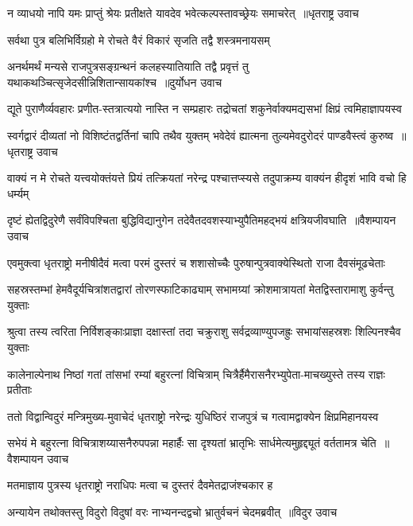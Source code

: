 \twolineshloka
{न व्याधयो नापि यमः प्राप्तुं श्रेयः प्रतीक्षते}
{यावदेव भवेत्कल्पस्तावच्छ्रेयः समाचरेत् ॥धृतराष्ट्र उवाच}


\twolineshloka
{सर्वथा पुत्र बलिभिर्विग्रहो मे रोचते}
{वैरं विकारं सृजति तद्वै शस्त्रमनायसम्}


\twolineshloka
{अनर्थमर्थं मन्यसे राजपुत्रसङ्ग्रन्थनं कलहस्यातियाति}
{तद्वै प्रवृत्तं तु यथाकथञ्चित्सृजेदसीन्निशितान्सायकांश्च ॥दुर्योधन उवाच}


\twolineshloka
{द्यूते पुराणैर्व्यवहारः प्रणीत-स्तत्रात्ययो नास्ति न सम्प्रहारः}
{तद्रोचतां शकुनेर्वाक्यमद्यसभां क्षिप्रं त्वमिहाज्ञापयस्व}


\threelineshloka
{स्वर्गद्वारं दीव्यतां नो विशिष्टंतद्वर्तिनां चापि तथैव युक्तम्}
{भवेदेवं ह्यात्मना तुल्यमेवदुरोदरं पाण्डवैस्त्वं कुरुष्व ॥धृतराष्ट्र उवाच}
{}


\twolineshloka
{वाक्यं न मे रोचते यत्त्वयोक्तंयत्ते प्रियं तत्क्रियतां नरेन्द्र}
{पश्चात्तप्स्यसे तदुपाक्रम्य वाक्यंन हीदृशं भावि वचो हि धर्म्यम्}


\twolineshloka
{दृष्टं ह्येतद्विदुरेणै सर्वंविपश्चिता बुद्धिविद्यानुगेन}
{तदेवैतदवशस्याभ्युपैतिमहद्भयं क्षत्रियजीवघाति ॥वैशम्पायन उवाच}


\twolineshloka
{एवमुक्त्वा धृतराष्ट्रो मनीषीदैवं मत्वा परमं दुस्तरं च}
{शशासोच्चैः पुरुषान्पुत्रवाक्येस्थितो राजा दैवसंमूढचेताः}


\twolineshloka
{सहस्रस्तम्भां हेमवैदूर्यचित्रांशतद्वारां तोरणस्फाटिकाढ्याम्}
{सभामग्र्यां क्रोशमात्रायतां मेतद्विस्तारामाशु कुर्वन्तु युक्ताः}


\twolineshloka
{श्रुत्वा तस्य त्वरिता निर्विशङ्काःप्राज्ञा दक्षास्तां तदा चक्रुराशु}
{सर्वद्रव्याण्युपजह्रुः सभायांसहस्रशः शिल्पिनश्चैव युक्ताः}


\twolineshloka
{कालेनाल्पेनाथ निष्ठां गतां तांसभां रम्यां बहुरत्नां विचित्राम्}
{चित्रैर्हैमैरासनैरभ्युपेता-माचख्युस्ते तस्य राज्ञः प्रतीताः}


\twolineshloka
{ततो विद्वान्विदुरं मन्त्रिमुख्य-मुवाचेदं धृतराष्ट्रो नरेन्द्रः}
{युधिष्ठिरं राजपुत्रं च गत्वामद्वाक्येन क्षिप्रमिहानयस्व}


\twolineshloka
{सभेयं मे बहुरत्ना विचित्राशय्यासनैरुपपन्ना महार्हैः}
{सा दृश्यतां भ्रातृभिः सार्धमेत्यमुहृद्द्यूतं वर्ततामत्र चेति ॥वैशम्पायन उवाच}


\twolineshloka
{मतमाज्ञाय पुत्रस्य धृतराष्ट्रो नराधिपः}
{मत्वा च दुस्तरं दैवमेतद्राजंश्चकार ह}


\twolineshloka
{अन्यायेन तथोक्तस्तु विदुरो विदुषां वरः}
{नाभ्यनन्दद्वचो भ्रातुर्वचनं चेदमब्रवीत् ॥विदुर उवाच}


